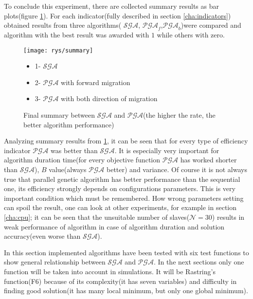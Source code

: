 To conclude this experiment, there are collected summary results as bar
plots(figure \ref{fig:bar}). For each indicator(fully described in section
\ref{cha:indicators}) obtained results from three algorithms(
$\mathcal{SGA}$, $\mathcal{PGA}_f$,$\mathcal{PGA}_b$)were compared
and algorithm with the best result was awarded with $1$ while others with zero.
\nopagebreak
\begin{figure}[!htpb]
	\begin{center}
		\texttt{[image: rys/summary]}
	\end{center}
	\caption{Final summary between $\mathcal{SGA}$ and $\mathcal{PGA}$(the
	higher the rate, the better algorithm performance) }
	\label{fig:bar}
	\newline
	\begin{itemize}
		\item 1- $\mathcal{SGA}$
		\item 2- $\mathcal{PGA}$ with forward migration
		\item 3- $\mathcal{PGA}$ with both direction of migration
	\end{itemize}
\end{figure}
Analyzing summary results from \ref{fig:bar}, it can be seen that for every
type of efficiency indicator $\mathcal{PGA}$ was better than $\mathcal{SGA}$. It is
especially very important for algorithm duration time(for every objective
function $\mathcal{PGA}$ has worked shorter than $\mathcal{SGA}$), $B$
value(always $\mathcal{PGA}$ better) and variance. Of
course it is not always true that parallel genetic algorithm has better
performance than the sequential one, its efficiency strongly depends on configurations
parameters. This is very important condition which must be remembered. How wrong
parameters setting can spoil the result, one can look at other experiments, for example in section
\ref{cha:cpu}; it can be seen that the unsuitable number of slaves($\mathcal{N}=30$) results in weak
performance of algorithm in case of algorithm duration and solution accuracy(even worse than $\mathcal{SGA}$).

In this section implemented algorithms have been tested with six test functions to
show general relationship between $\mathcal{SGA}$ and $\mathcal{PGA}$. In the
next sections only one function will be taken into account in simulations. It
will be Rastring's function(F6) because of its complexity(it has seven variables) and 
difficulty in finding good solution(it has many local minimum, but only one global
minimum).  


